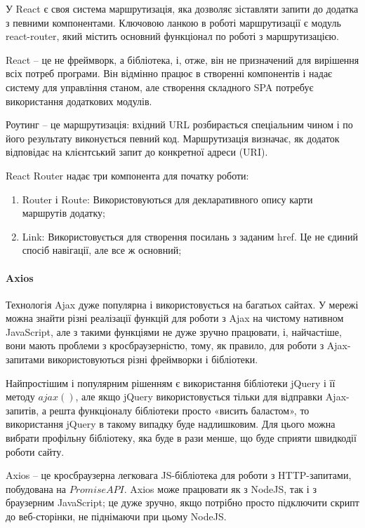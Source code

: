 У React є своя система маршрутизація, яка дозволяє зіставляти запити до додатка з певними компонентами. Ключовою ланкою в роботі маршрутизації є модуль react-router, який містить основний функціонал по роботі з маршрутизацією.

React -- це не фреймворк, а бібліотека, і, отже, він не призначений для вирішення всіх потреб програми. Він відмінно працює в створенні компонентів і надає систему для управління станом, але створення складного SPA потребує використання додаткових модулів.

Роутинг -- це маршрутизація: вхідний URL розбирається спеціальним чином і по його результату виконується певний код. Маршрутизація визначає, як додаток відповідає на клієнтський запит до конкретної адреси (URI).

React Router надає три компонента для початку роботи:

\begin{enumerate}
    \item Router і Route: Використовуються для декларативного опису карти маршрутів додатку;
    \item Link: Використовується для створення посилань з заданим href. Це не єдиний спосіб навігації, але все ж основний;
\end{enumerate}

\paragraph{Axios}

Технологія Ajax дуже популярна і використовується на багатьох сайтах. У мережі можна знайти різні реалізації функцій для роботи з Ajax на чистому нативном JavaScript, але з такими функціями не дуже зручно працювати, і, найчастіше, вони мають проблеми з кросбраузерністю, тому, як правило, для роботи з Ajax-запитами використовуються різні фреймворки і бібліотеки.

Найпростішим і популярним рішенням є використання бібліотеки jQuery і її методу $ajax()$, але якщо jQuery використовується тільки для відправки Ajax-запитів, а решта функціоналу бібліотеки просто «висить баластом», то використання jQuery в такому випадку буде надлишковим. Для цього можна вибрати профільну бібліотеку, яка буде в рази менше, що буде сприяти швидкодії роботи сайту.

Axios -- це кросбраузерна легковага JS-бібліотека для роботи з HTTP-запитами, побудована на $Promise API$. Axios може працювати як з NodeJS, так і з браузерним JavaScript; це дуже зручно, якщо потрібно просто підключити скрипт до веб-сторінки, не піднімаючи при цьому NodeJS.
